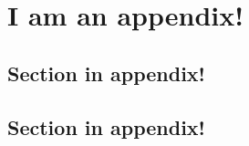 \chapter{I am an appendix!}
\label{ap:blindtext}

\blindtext

\section{Section in appendix!}
\label{sec:appsection}

\blindtext

\section{Section in appendix!}
\label{sec:appsection2}

\blindtext